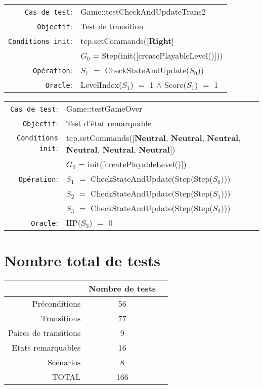\documentclass{article}
\begin{document}
{\small
  \begin{longtable}{rl}
    \texttt{Cas de test}: &\textrm{Game::testCheckAndUpdateTrans2}\\
    \texttt{Objectif}: & Test de transition\\
    \texttt{Conditions init}: & \textrm{tcp.setCommands([\textbf{Right}]}\\
    & $G_0$ = \textrm{Step(init([createPlayableLevel()]))}\\
    \texttt{Opération}: &$S_1$ $=$ \textrm{CheckStateAndUpdate($S_0$))}\\
    \texttt{Oracle}: &\textrm{LevelIndex($S_1$)} $=$ 1 $\land$ \textrm{Score($S_1$)} $=$ 1\\
  \end{longtable}}

{\small
  \begin{longtable}{rl}
    \texttt{Cas de test}: &\textrm{Game::testGameOver}\\
    \texttt{Objectif}: & Test d'état remarquable \\
    \texttt{Conditions init}: & \textrm{tcp.setCommands([\textbf{Neutral}, \textbf{Neutral}, \textbf{Neutral}, \textbf{Neutral}, \textbf{Neutral}, \textbf{Neutral}])}\\
    & $G_0$ = \textrm{init([createPlayableLevel()])}\\
    \texttt{Opération}: &$S_1$ $=$ \textrm{CheckStateAndUpdate(Step(Step($S_0$)))}\\
    &$S_2$ $=$ \textrm{CheckStateAndUpdate(Step(Step($S_1$)))}\\
    &$S_3$ $=$ \textrm{CheckStateAndUpdate(Step(Step($S_2$)))}\\
    \texttt{Oracle}: &\textrm{HP($S_3$)} $=$ 0\\
  \end{longtable}}

\begin{minipage}{\textwidth}
\section{Nombre total de tests}
\begin{longtable}{r|cc}
  &Nombre de tests\\
  \hline
  Préconditions & 56\\
  Transitions & 77\\
  Paires de transitions & 9\\
  Etats remarquables & 16\\
  Scénarios & 8\\
  TOTAL & 166\\
\end{longtable}
\end{minipage}
\end{document}
